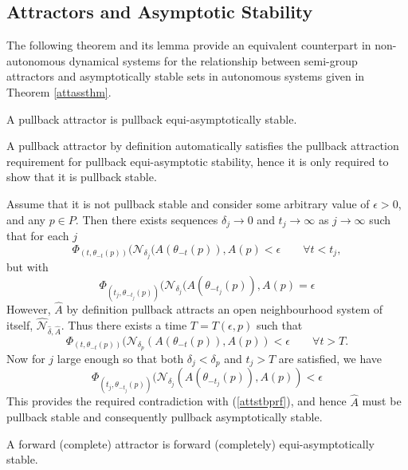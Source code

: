 \subsection{Attractors and Asymptotic Stability}

The following theorem and its lemma provide an equivalent
counterpart in non-autonomous dynamical systems for the
relationship between semi-group attractors and asymptotically
stable sets in autonomous systems given in Theorem
\ref{attassthm}.

\begin{therm}\label{papasthm}
A pullback attractor is pullback equi-asymptotically stable.
\end{therm}
\begin{prf}
  A pullback attractor by definition automatically satisfies the
  pullback attraction requirement for pullback equi-asymptotic stability, hence
  it is only required to show that it is pullback stable.

  Assume that it is not pullback stable and consider some arbitrary value of
  $\epsilon > 0$, and any  $p \in P$. Then there exists
  sequences $\delta_j \rightarrow 0$ and $t_j \rightarrow \infty$ as $j
  \rightarrow \infty$ such that for each $j$
  \[ \Phi_{(t,\theta_{-t}(p))}
       (\mathcal{N}_{\delta_j}(A(\theta_{-t}(p)),A(p) < \epsilon
       \qquad \forall t < t_j, \]
  but with
  \begin{equation} \label{attstbprf}
  \Phi_{(t_j,\theta_{-t_j}(p))}
       (\mathcal{N}_{\delta_j} (A(\theta_{-t_j}(p)),A(p) =
       \epsilon
  \end{equation}
  However, $\hat{A}$ by definition pullback attracts an open
  neighbourhood system of itself, $\hat{\mathcal{N}}_{\hat{\delta},
  \hat{A}}$. Thus there exists a time $T = T(\epsilon, p)$ such that
  \[ \Phi_{(t,\theta_{-t}(p))}
       (\mathcal{N}_{\delta_p}(A(\theta_{-t}(p)),A(p)) < \epsilon
       \qquad \forall t > T. \]
  Now for $j$ large enough so that both $\delta_j < \delta_p$ and $t_j > T$
  are satisfied, we have
  \[ \Phi_{(t_j,\theta_{-t_j}(p))}
       (\mathcal{N}_{\delta_j}(A(\theta_{-t_j}(p)),A(p))  < \epsilon \]
  This provides the required contradiction with (\ref{attstbprf}),
  and hence $\hat{A}$ must be pullback stable and consequently pullback
  asymptotically stable.
\end{prf}

\begin{lemma}
A forward (complete) attractor is forward (completely) equi-asymptotically
stable.
\end{lemma}

